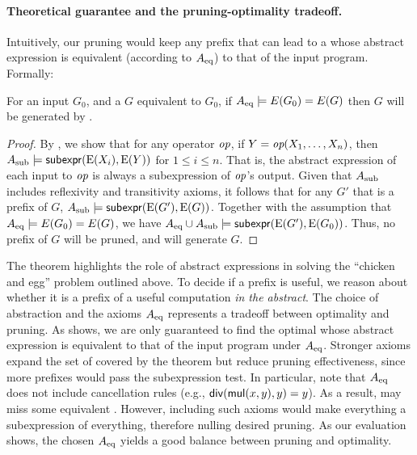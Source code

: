 \paragraph{Theoretical guarantee and the pruning-optimality tradeoff.}
Intuitively, our pruning would keep any prefix that can lead to a \graph whose abstract expression is equivalent (according to $A_\text{eq}$) to that of the input \lax program. Formally:

\begin{theorem}
\label{thm:pruning}
For an input \graph $G_0$, and a \graph $G$ equivalent to $G_0$,
if $A_\text{eq} \models E(G_0) = E(G)$ then $G$ will be generated by .
\end{theorem}

\iffinal
\begin{proof}
By , we show that for any operator $\mbox{\rm\em op}$, if $Y = \mbox{\rm\em op}(X_1,\ldots,X_n)$, then 
$A_\text{sub} \models \mathsf{subexpr}(\mathrm{E}(X_i), \mathrm{E}(Y))$ for $1 \leq i \leq n$.
That is, the abstract expression of each input to $\mbox{\rm\em op}$ is always a subexpression of $\mbox{\rm\em op}$'s output.
Given that $A_\text{sub}$ includes reflexivity and transitivity axioms,
it follows that for any $G'$ that is a prefix of $G$, $A_\text{sub} \models \mathsf{subexpr}(\mathrm{E}(G'),\mathrm{E}(G))$.
Together with the assumption that $A_\text{eq} \models E(G_0) = E(G)$,
we have $A_\text{eq} \cup A_\text{sub} \models \mathsf{subexpr}(\mathrm{E}(G'),\mathrm{E}(G_0))$.
Thus, no prefix of $G$ will be pruned, and \sys will generate $G$.
\end{proof}
\fi 

The theorem highlights the role of abstract expressions in solving the ``chicken and egg'' problem outlined above. To decide if a prefix \graph is useful, we reason about whether it is a prefix of a useful computation \emph{in the abstract}. The choice of abstraction and the axioms $A_\text{eq}$ represents a tradeoff between optimality and pruning.
As  shows, we are only guaranteed to find the optimal \graph whose abstract expression is equivalent to that of the input program under $A_\text{eq}$. Stronger axioms expand the set of \graphs covered by the theorem but reduce pruning effectiveness, since more prefixes would pass the subexpression test. In particular, note that $A_\text{eq}$ does not include cancellation rules (e.g., $\mathsf{div}(\mathsf{mul}(x,y),y) = y$). As a result, \sys may miss some equivalent \graphs.
However, including such axioms would make everything a subexpression of everything, therefore nulling desired pruning.
As our evaluation shows, the chosen $A_\text{eq}$ yields a good balance between pruning and optimality.








